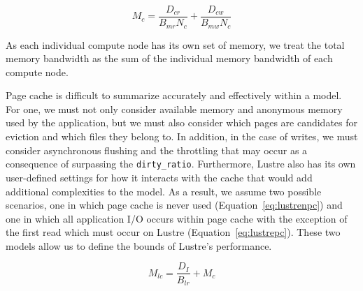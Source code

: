 \documentclass{report}
\begin{document}
    \begin{equation}\label{eq:cache}
        M_{c} = \frac{D_{cr}}{B_{mr}N_{c}} + \frac{D_{cw}}{B_{mw}N_{c}}
    \end{equation}
    

    As each individual compute node has its own set of memory, we treat the total 
    memory bandwidth as the sum of the individual memory bandwidth of each compute node.


    Page cache is difficult to summarize accurately and effectively within a model.
    For one, we must not only consider available memory and anonymous memory used by
    the application, but we must also consider which pages are candidates for eviction
    and which files they belong to. In addition, in the case of writes, we must consider
    asynchronous flushing and the throttling that may occur as a consequence of surpassing
    the \texttt{dirty\_ratio}. Furthermore, Lustre also has its own user-defined settings
    for how it interacts with the cache that would add additional complexities to the model.
    As a result, we assume two possible scenarios, one in which page cache is never used (Equation~\ref{eq:lustrenpc})
    and one in which all application I/O occurs within page cache with the exception of the
    first read which must occur on Lustre (Equation~\ref{eq:lustrepc}). These two models allow
    us to define the bounds of Lustre's performance.

    \begin{equation}\label{eq:lustrepc}
        M_{lc} = \frac{D_{I}}{B_{lr}} + M_{c}
    \end{equation}

\end{document}
